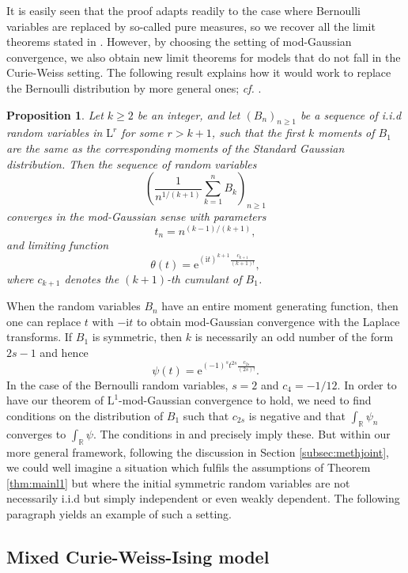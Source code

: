 \documentclass[12pt,a4paper,reqno]{amsart}
\newcommand{\R}{\mathbb{R}}
\newcommand{\E}{\mathrm{e}}
\newcommand{\I}{\mathrm{i}}
\newtheorem{proposition}[theorem]{Proposition}
\theoremstyle{remark}
\begin{document}
It is easily seen that the proof adapts readily to the case where Bernoulli variables are replaced by so-called pure measures, so we recover all the limit theorems stated in \cite{EN78,ENR80}. However, by choosing the setting of mod-Gaussian convergence, we also obtain new limit theorems for models that do not fall in the Curie-Weiss setting. The following result explains how it would work to replace the Bernoulli distribution by more general ones; \emph{cf.} \cite[Proposition 2.2]{KNN13}. 

\begin{proposition}
Let $k\geq2$ be an integer, and let $(B_n)_{n\geq1}$ be a sequence of i.i.d random variables in $\mathrm{L}^r$ for some $r>k+1$, such that the first $k$ moments of $B_1$ are the same as the corresponding moments of the Standard Gaussian distribution. Then the sequence of random variables 
$$\left(\frac{1}{n^{1/(k+1)}} \sum_{k=1}^n B_k\right)_{n\geq1}$$
converges in the mod-Gaussian sense with parameters $$t_n=n^{(k-1)/(k+1)},$$
and limiting function $$\theta(t)=\E^{(\I t)^{k+1}\frac{c_{k+1}}{(k+1)!}},$$
where $c_{k+1}$ denotes the $(k+1)$-th cumulant of $B_1$.
\end{proposition}

When the random variables $B_n$ have an entire moment generating function, then one can replace $t$ with $-\I t$ to obtain mod-Gaussian convergence with the Laplace transforms. If $B_1$ is  symmetric, then $k$ is necessarily an 
odd number of the form $2s-1$ and hence $$\psi(t)=\E^{(-1)^s t^{2s}\frac{c_{2s}}{(2s)!}}.$$In the case of the Bernoulli random variables, $s=2$ and $c_4=-1/12$. In order to have our theorem of $\mathrm{L}^1$-mod-Gaussian convergence to hold, we need to find conditions on the distribution of $B_1$ such that $c_{2s}$ is negative and that $\int_\R \psi_n$ converges to $\int_\R \psi$. The conditions in \cite{EN78} and \cite{ENR80} precisely imply these. But within our more general framework, following the discussion in Section \ref{subsec:methjoint}, we could well imagine a situation which fulfils the assumptions of Theorem \ref{thm:mainl1} but where the initial symmetric random variables are not necessarily i.i.d but simply independent or even weakly dependent. The following paragraph yields an example of such a setting.
\medskip



\subsection{Mixed Curie-Weiss-Ising model}
\end{document}

